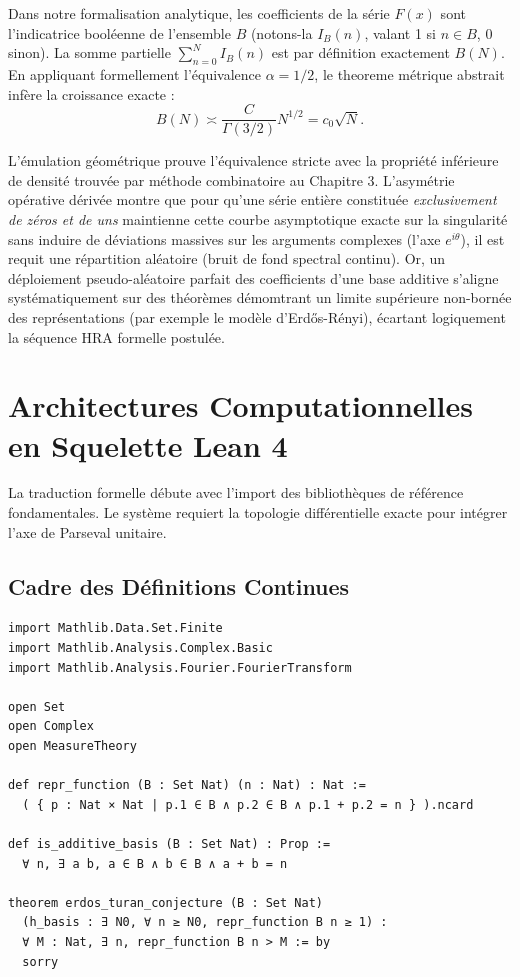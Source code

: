 \documentclass[12pt,a4paper]{article}
\begin{document}
Dans notre formalisation analytique, les coefficients de la s\'erie $F(x)$ sont l'indicatrice bool\'eenne de l'ensemble $B$ (notons-la $I_B(n)$, valant 1 si $n \in B$, 0 sinon). La somme partielle $\sum_{n=0}^N I_B(n)$ est par d\'efinition exactement $B(N)$.
En appliquant formellement l'\'equivalence $\alpha = 1/2$, le theoreme m\'etrique abstrait inf\`ere la croissance exacte :
\begin{equation}
B(N) \asymp \frac{C}{\Gamma(3/2)} N^{1/2} = c_0 \sqrt{N}.
\end{equation}

L'\'emulation g\'eom\'etrique prouve l'\'equivalence stricte avec la propri\'et\'e inf\'erieure de densit\'e trouv\'ee par m\'ethode combinatoire au Chapitre 3.
L'asym\'etrie op\'erative d\'eriv\'ee montre que pour qu'une s\'erie enti\`ere constitu\'ee \textit{exclusivement de z\'eros et de uns} maintienne cette courbe asymptotique exacte sur la singularit\'e sans induire de d\'eviations massives sur les arguments complexes (l'axe $e^{i\theta}$), il est requit une r\'epartition al\'eatoire (bruit de fond spectral continu). Or, un d\'eploiement pseudo-al\'eatoire parfait des coefficients d'une base additive s'aligne syst\'ematiquement sur des th\'eor\`emes d\'emomtrant un limite sup\'erieure non-born\'ee des repr\'esentations (par exemple le mod\`ele d'Erd\H{o}s-R\'enyi), \'ecartant logiquement la s\'equence HRA formelle postul\'ee.

\section{Architectures Computationnelles en Squelette Lean 4}

La traduction formelle d\'ebute avec l'import des biblioth\`eques de r\'ef\'erence fondamentales. Le syst\`eme requiert la topologie diff\'erentielle exacte pour int\'egrer l'axe de Parseval unitaire.

\subsection{Cadre des D\'efinitions Continues}
\begin{verbatim}
import Mathlib.Data.Set.Finite
import Mathlib.Analysis.Complex.Basic
import Mathlib.Analysis.Fourier.FourierTransform

open Set
open Complex
open MeasureTheory

def repr_function (B : Set Nat) (n : Nat) : Nat :=
  ( { p : Nat × Nat | p.1 ∈ B ∧ p.2 ∈ B ∧ p.1 + p.2 = n } ).ncard

def is_additive_basis (B : Set Nat) : Prop :=
  ∀ n, ∃ a b, a ∈ B ∧ b ∈ B ∧ a + b = n

theorem erdos_turan_conjecture (B : Set Nat)
  (h_basis : ∃ N0, ∀ n ≥ N0, repr_function B n ≥ 1) :
  ∀ M : Nat, ∃ n, repr_function B n > M := by
  sorry
\end{verbatim}
\end{document}

